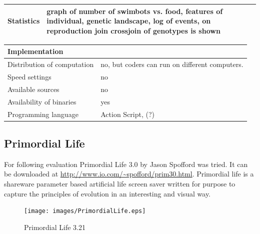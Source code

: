 \documentclass[a4paper,12pt]{report}
\begin{document}
 \vspace{10pt}
 \begin{tabular}{|p{150pt}|p{220pt}|} \hline \textbf{Statistics}&graph of number of swimbots vs. food, features of individual, genetic landscape, log of events, on reproduction join crossjoin of genotypes is shown \\ \hline
\end{tabular} 

 \vspace{10pt}
 \begin{tabular}{|p{150pt}|p{220pt}|} \hline \textbf{Implementation}& \\ \hline
Distribution of computation&no, but coders can run on different computers. \\ \hline
Speed settings&no \\ \hline
Available sources&no \\ \hline
Availability of binaries&yes \\ \hline
Programming language&Action Script, (?) \\ \hline
\end{tabular}

\subsection {Primordial Life}
For following evaluation Primordial Life 3.0 by Jason Spofford was tried. It can be downloaded at \url{http://www.io.com/~spofford/prim30.html}. Primordial life is a shareware parameter based artificial life screen saver written for purpose to capture the principles of evolution in an interesting and visual way.

\begin{figure}
\begin{center}
  \texttt{[image: images/PrimordialLife.eps]}
  \caption{Primordial Life 3.21}
  \label{img.PrimordialLife}
\end{center}
\end{figure}
\end{document}
